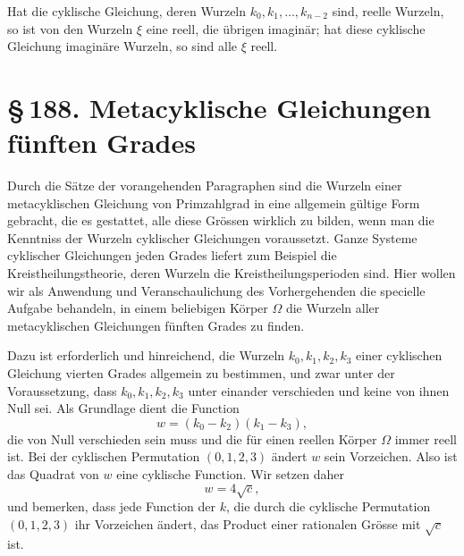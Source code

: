 \documentclass[11pt]{article}
\providecommand{\sect}[2]{\section*{\S\,#1. #2}}
\begin{document}
Hat die cyklische Gleichung, deren Wurzeln $k_0,k_1,\ldots,k_{n-2}$ sind, reelle Wurzeln, so ist von den Wurzeln $\xi$ eine reell, die \"ubrigen imagin\"ar; hat diese cyklische Gleichung imagin\"are Wurzeln, so sind alle $\xi$ reell.

\sect{188}{Metacyklische Gleichungen f\"unften Grades}

Durch die S\"atze der vorangehenden Paragraphen sind die Wurzeln einer metacyklischen Gleichung von Primzahlgrad in eine allgemein g\"ultige Form gebracht, die es gestattet, alle diese Gr\"ossen wirklich zu bilden, wenn man die Kenntniss der Wurzeln cyklischer Gleichungen voraussetzt. Ganze Systeme cyklischer Gleichungen jeden Grades liefert zum Beispiel die Kreistheilungstheorie, deren Wurzeln die Kreistheilungsperioden sind. Hier wollen wir als Anwendung und Veranschaulichung des Vorhergehenden die specielle Aufgabe behandeln, in einem beliebigen K\"orper $\Omega$ die Wurzeln aller metacyklischen Gleichungen f\"unften Grades zu finden.

Dazu ist erforderlich und hinreichend, die Wurzeln $k_0,k_1,k_2,k_3$ einer cyklischen Gleichung vierten Grades allgemein zu bestimmen, und zwar unter der Voraussetzung, dass $k_0,k_1,k_2,k_3$ unter einander verschieden und keine von ihnen Null sei. Als Grundlage dient die Function
\begin{equation}\tag{1}
  w=(k_0-k_2)(k_1-k_3),
\end{equation}
die von Null verschieden sein muss und die f\"ur einen reellen K\"orper $\Omega$ immer reell ist. Bei der cyklischen Permutation $(0,1,2,3)$ \"andert $w$ sein Vorzeichen. Also ist das Quadrat von $w$ eine cyklische Function. Wir setzen daher
\begin{equation}\tag{2}
  w=4\sqrt{c},
\end{equation}
und bemerken, dass jede Function der $k$, die durch die cyklische Permutation $(0,1,2,3)$ ihr Vorzeichen \"andert, das Product einer rationalen Gr\"osse mit $\sqrt c$ ist.
\end{document}

